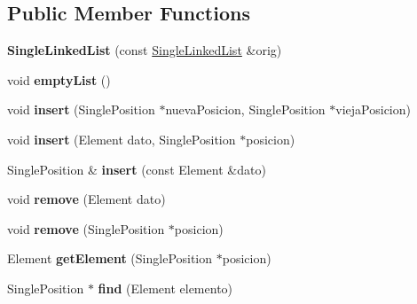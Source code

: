 \subsection*{Public Member Functions}
\begin{DoxyCompactItemize}
\item 
\mbox{\label{class_single_linked_list_aa364b7946b893304e20eef2edfcebc92}} 
{\bfseries Single\+Linked\+List} (const \hyperlink{class_single_linked_list}{Single\+Linked\+List} \&orig)
\item 
\mbox{\label{class_single_linked_list_a4571b835dd822965aa73c8b72a0978fa}} 
void {\bfseries empty\+List} ()
\item 
\mbox{\label{class_single_linked_list_a82148c94788ea055b4015d9740148216}} 
void {\bfseries insert} (Single\+Position $\ast$nueva\+Posicion, Single\+Position $\ast$vieja\+Posicion)
\item 
\mbox{\label{class_single_linked_list_a832b8c56d170fe24fa65470c6450c8c0}} 
void {\bfseries insert} (Element dato, Single\+Position $\ast$posicion)
\item 
\mbox{\label{class_single_linked_list_aa94809f2f418d8ae0800c07ad2d3ed94}} 
Single\+Position \& {\bfseries insert} (const Element \&dato)
\item 
\mbox{\label{class_single_linked_list_a7eef7eef98a4f6685206ea18e2898c46}} 
void {\bfseries remove} (Element dato)
\item 
\mbox{\label{class_single_linked_list_a15c09862753af9929640337bfd8d3883}} 
void {\bfseries remove} (Single\+Position $\ast$posicion)
\item 
\mbox{\label{class_single_linked_list_a7fb584382382318fed5360cb508bca78}} 
Element {\bfseries get\+Element} (Single\+Position $\ast$posicion)
\item 
\mbox{\label{class_single_linked_list_a6380aea4313c50d930fa0117c878fb48}} 
Single\+Position $\ast$ {\bfseries find} (Element elemento)

\end{DoxyCompactItemize}
